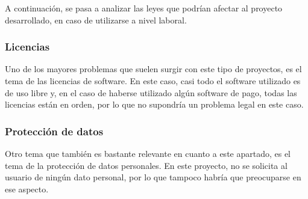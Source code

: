 A continuación, se pasa a analizar las leyes que podrían afectar al proyecto desarrollado, en caso de utilizarse a nivel laboral.

\subsubsection{Licencias}

Uno de los mayores problemas que suelen surgir con este tipo de proyectos, es el tema de las licencias de software.
En este caso, casi todo el software utilizado es de uso libre y, en el caso de haberse utilizado algún software de pago, todas las licencias están en orden, por lo que no supondría un problema legal en este caso.

\subsubsection{Protección de datos}

Otro tema que también es bastante relevante en cuanto a este apartado, es el tema de la protección de datos personales.
En este proyecto, no se solicita al usuario de ningún dato personal, por lo que tampoco habría que preocuparse en ese aspecto.
